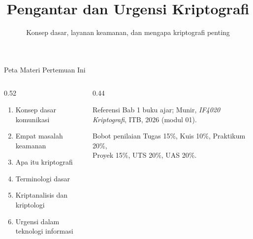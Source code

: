 \documentclass[aspectratio=169,11pt]{beamer}
\title{Pengantar dan Urgensi Kriptografi}
\subtitle{Konsep dasar, layanan keamanan, dan mengapa kriptografi penting}
\begin{document}
\begin{frame}[plain]
    \titlepage
\end{frame}

\begin{frame}{Peta Materi Pertemuan Ini}
    \begin{columns}[T,onlytextwidth]
        \begin{column}{0.52\textwidth}
            \begin{enumerate}
                \item Konsep dasar komunikasi
                \item Empat masalah keamanan
                \item Apa itu kriptografi
                \item Terminologi dasar
                \item Kriptanalisis dan kriptologi
                \item Urgensi dalam teknologi informasi
            \end{enumerate}
        \end{column}
        \begin{column}{0.44\textwidth}
            \begin{block}{Referensi}
                \footnotesize
                Bab 1 buku ajar; Munir, \textit{IF4020 Kriptografi},
                ITB, 2026 (modul 01).
            \end{block}
            \begin{exampleblock}{Bobot penilaian}
                \footnotesize
                Tugas 15\%, Kuis 10\%, Praktikum 20\%,\\
                Proyek 15\%, UTS 20\%, UAS 20\%.
            \end{exampleblock}
        \end{column}
    \end{columns}
\end{frame}
\end{document}
